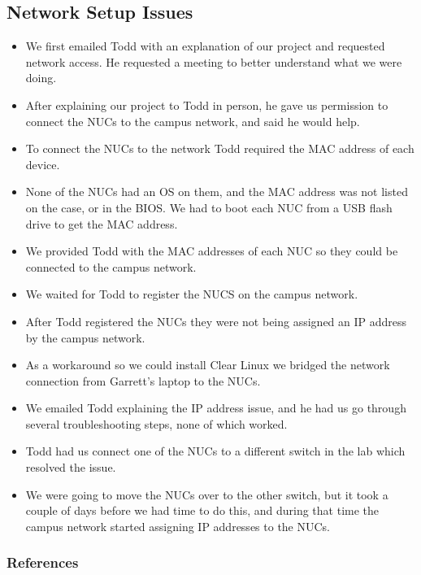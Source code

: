 \documentclass[pdf]{beamer}
\begin{document}
\begin{frame}[allowframebreaks]
	\section{Network Setup Issues}
	\begin{itemize}
		\item We first emailed Todd with an explanation of our project and 
			requested network access. He requested a meeting to better 
			understand what we were doing.
		\item After explaining our project to Todd in person, he gave us 
			permission to connect the NUCs to the campus network, and said he 
			would help.
		\item To connect the NUCs to the network Todd required the MAC address 
			of each device.
		\item None of the NUCs had an OS on them, and the MAC address was not 
			listed on the case, or in the BIOS.
			We had to boot each NUC from a USB flash drive to get the MAC 
			address.
		\item We provided Todd with the MAC addresses of each NUC so they could 
			be connected to the campus network.
		\item We waited for Todd to register the NUCS on the campus network.
		\item After Todd registered the NUCs they were not being assigned an IP 
			address by the campus network.
		\item As a workaround so we could install Clear Linux we bridged the 
			network connection from Garrett's laptop to the NUCs.
		\item We emailed Todd explaining the IP address issue, and he had us go
			through several troubleshooting steps, none of which worked.
		\item Todd had us connect one of the NUCs to a different switch in the 
			lab which resolved the issue.
		\item We were going to move the NUCs over to the other switch, but it 
			took a couple of days before we had time to do this, and during 
			that time the campus network started assigning IP addresses to the 
			NUCs.
	\end{itemize}

\end{frame}

\begin{frame}
\end{frame}
\begin{frame}
	\frametitle{References}
		
		
	\end{frame}
\end{document}
